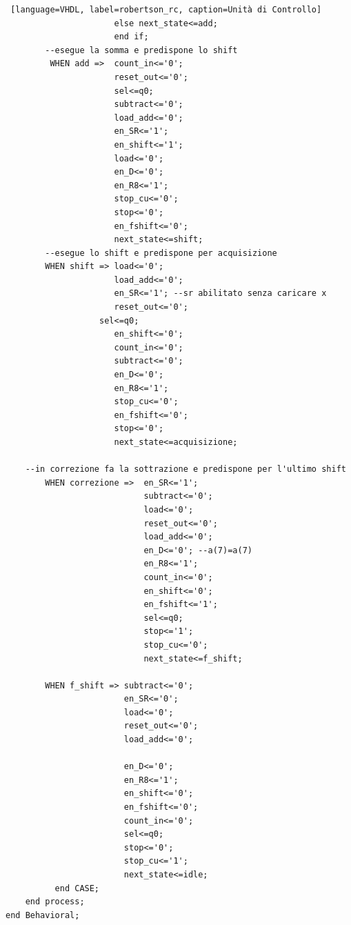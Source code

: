 \begin{lstlisting} [language=VHDL, label=robertson_rc, caption=Unità di Controllo]
					  else next_state<=add;
					  end if;
		--esegue la somma e predispone lo shift  
		 WHEN add =>  count_in<='0';
					  reset_out<='0'; 
		              sel<=q0;
					  subtract<='0';
					  load_add<='0'; 
					  en_SR<='1'; 
					  en_shift<='1';
					  load<='0'; 
					  en_D<='0';
					  en_R8<='1';
					  stop_cu<='0';
					  stop<='0';
					  en_fshift<='0';
					  next_state<=shift;
		--esegue lo shift e predispone per acquisizione	  
		WHEN shift => load<='0';
					  load_add<='0';
					  en_SR<='1'; --sr abilitato senza caricare x
					  reset_out<='0'; 
		           sel<=q0;
					  en_shift<='0';
					  count_in<='0';
					  subtract<='0';
					  en_D<='0';
					  en_R8<='1';
					  stop_cu<='0';
					  en_fshift<='0';
					  stop<='0';
					  next_state<=acquisizione;
	
	--in correzione fa la sottrazione e predispone per l'ultimo shift
		WHEN correzione => 	en_SR<='1';
							subtract<='0';
							load<='0'; 
							reset_out<='0'; 
							load_add<='0';
							en_D<='0'; --a(7)=a(7)
							en_R8<='1';
							count_in<='0';
							en_shift<='0';
							en_fshift<='1';
							sel<=q0;
							stop<='1';
							stop_cu<='0';
							next_state<=f_shift;
		
		WHEN f_shift => subtract<='0';
		                en_SR<='0';
						load<='0'; 
						reset_out<='0'; 
						load_add<='0';
						
						en_D<='0';
						en_R8<='1';
						en_shift<='0';
						en_fshift<='0';
						count_in<='0';
						sel<=q0;
						stop<='0';
						stop_cu<='1';
						next_state<=idle;
		  end CASE;
	end process; 
end Behavioral;

\end{lstlisting}


